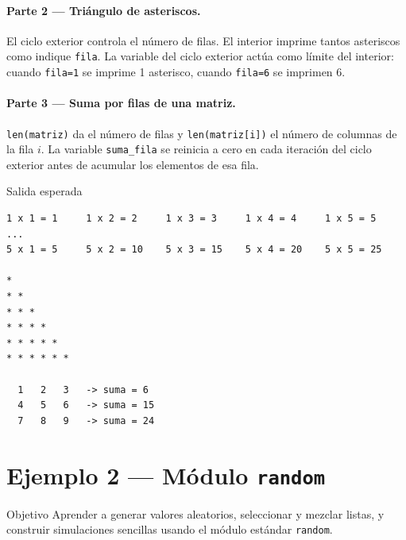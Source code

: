 \documentclass[12pt,a4paper]{article}
\begin{document}
\paragraph{Parte 2 — Triángulo de asteriscos.}
El ciclo exterior controla el número de filas. El interior imprime tantos
asteriscos como indique \texttt{fila}. La variable del ciclo exterior actúa
como límite del interior: cuando \texttt{fila=1} se imprime 1 asterisco, cuando
\texttt{fila=6} se imprimen 6.

\paragraph{Parte 3 — Suma por filas de una matriz.}
\texttt{len(matriz)} da el número de filas y \texttt{len(matriz[i])} el número
de columnas de la fila $i$. La variable \texttt{suma\_fila} se reinicia a cero en
cada iteración del ciclo exterior antes de acumular los elementos de esa fila.

\vspace{0.6em}
\begin{salidabox}{Salida esperada}
\begin{lstlisting}[style=OutputStyle]
1 x 1 = 1     1 x 2 = 2     1 x 3 = 3     1 x 4 = 4     1 x 5 = 5
...
5 x 1 = 5     5 x 2 = 10    5 x 3 = 15    5 x 4 = 20    5 x 5 = 25

*
* *
* * *
* * * *
* * * * *
* * * * * *

  1   2   3   -> suma = 6
  4   5   6   -> suma = 15
  7   8   9   -> suma = 24
\end{lstlisting}
\end{salidabox}

\newpage
\section{Ejemplo 2 — Módulo \texttt{random}}
\label{sec:ejemplo2}

\begin{objetivobox}{Objetivo}
Aprender a generar valores aleatorios, seleccionar y mezclar listas,
y construir simulaciones sencillas usando el módulo estándar \texttt{random}.
\end{objetivobox}
\end{document}
